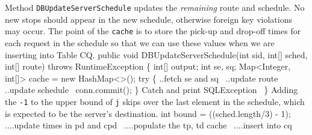 \documentclass{article}
\def\nwendcode{\endtrivlist \endgroup}
\let\nwdocspar=\par
\theoremstyle{definition}
\begin{document}
Method {\tt{}\protect{}DBUpdateServerSchedule} updates the \emph{remaining} route and
schedule.  No new stops should appear in the new schedule, otherwise foreign
key violations may occur. The point of the {\tt{}cache} is to store the
pick-up and drop-off times for each request in the schedule so that we
can use these values when we are inserting into Table CQ.
\nwenddocs{}\endmoddef{}
public void DBUpdateServerSchedule(int sid, int[] sched, int[] route)
throws RuntimeException \{
  int[] output;
  int se, sq;
  Map<Integer, int[]> cache = new HashMap<>();
  try \{
    \LA{}..fetch \code{}se\edoc{} and \code{}sq\edoc{}~{\nwtagstyle{}}\RA{}
    \LA{}..update route~{\nwtagstyle{}}\RA{}
    \LA{}..update schedule~{\nwtagstyle{}}\RA{}
    conn.commit();
  \}
  \LA{}Catch and print \code{}SQLException\edoc{}~{\nwtagstyle{}}\RA{}
\}
\eatline
{}\nwendcode{}Adding the {\tt{}-1} to the upper bound of {\tt{}j} skips over the last element
in the schedule, which is expected to be the server's destination.
\nwenddocs{}\endmoddef{}
int bound = ((sched.length/3) - 1);
\LA{}....update times in pd and cpd~{\nwtagstyle{}}\RA{}
\LA{}....populate the tp, td cache~{\nwtagstyle{}}\RA{}
\LA{}....insert into cq~{\nwtagstyle{}}\RA{}
\nwendcode{}\nwdocspar
\nwenddocs{}\endmoddef{}
\end{document}

